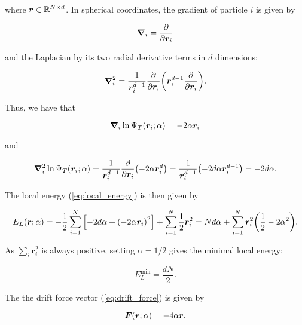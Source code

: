 where $\bm{r} \in \mathbb{R}^{N\times d}$. In spherical coordinates, the gradient of particle $i$ is given by 




\begin{equation*}
    \grad_i = \pdv{\bm{r}_i}
\end{equation*}

and the Laplacian by its two radial derivative terms in $d$ dimensions; 

\begin{equation*}
    \grad_i^2 = \frac{1}{\bm{r}_i^{d-1}} \pdv{\bm{r}_i} \qty(\bm{r}_i^{d-1} \pdv{\bm{r}_i}). 
\end{equation*} 

Thus, we have that 

\begin{equation*}
    \grad_i \ln \Psi_T \qty(\bm{r}_i; \alpha) = -2 \alpha \bm{r}_i 
\end{equation*} 

and 

\begin{equation*}
    \grad_i^2 \ln \Psi_T \qty(\bm{r}_i; \alpha) = \frac{1}{\bm{r}_i^{d-1}} \pdv{\bm{r}_i} \qty(-2 \alpha \bm{r}_i^d) = \frac{1}{\bm{r}_i^{d-1}}  \qty(-2 d \alpha \bm{r}_i^{d-1}) = -2 d \alpha .
\end{equation*}

The local energy (\autoref{eq:local_energy}) is then given by 

\begin{equation}
    E_L  \qty(\bm{r}; \alpha) = -\frac{1}{2} \sum_{i=1}^N \qty[- 2d \alpha + \qty(-2\alpha \bm{r}_i)^2] + \sum_{i=1}^N \frac{1}{2} \bm{r}_i^2 = Nd \alpha + \sum_{i=1}^N \bm{r}_i^2 \qty(\frac{1}{2} - 2 \alpha^2).
\end{equation}

As $\sum_i \bm{r}_i^2$ is always positive, setting $\alpha = 1 /2$ gives the minimal local energy;

\begin{equation}
    E_L^\mathrm{min} = \frac{d N}{2}.
\end{equation}

The the drift force vector (\autoref{eq:drift_force}) is given by 

\begin{equation}
    \bm{F}\qty(\bm{r}; \alpha) = - 4 \alpha \bm{r}.
\end{equation}



